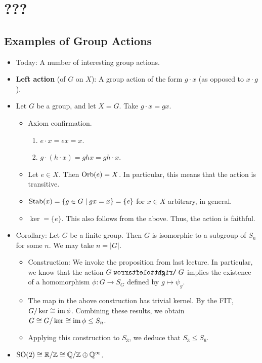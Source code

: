 \documentclass[../notes.tex]{subfiles}
\begin{document}
\chapter{???}
\section{Examples of Group Actions}
\begin{itemize}
    \item {}Today: A number of interesting group actions.
    \item \textbf{Left action} (of $G$ on $X$): A group action of the form $g\cdot x$ (as opposed to $x\cdot g$).
    \item Let $G$ be a group, and let $X=G$. Take $g\cdot x=gx$.
    \begin{itemize}
        \item Axiom confirmation.
        \begin{enumerate}
            \item $e\cdot x=ex=x$.
            \item $g\cdot(h\cdot x)=ghx=gh\cdot x$.
        \end{enumerate}
        \item Let $e\in X$. Then $\operatorname{Orb}(e)=X$. In particular, this means that the action is transitive.
        \item $\operatorname{Stab}(x)=\{g\in G\mid gx=x\}=\{e\}$ for $x\in X$ arbitrary, in general.
        \item $\ker=\{e\}$. This also follows from the above. Thus, the action is faithful.
    \end{itemize}
    \item Corollary: Let $G$ be a finite group. Then $G$ is isomorphic to a subgroup of $S_n$ for some $n$. We may take $n=|G|$.
    \begin{itemize}
        \item Construction: We invoke the proposition from last lecture. In particular, we know that the action $G\acts G$ implies the existence of a homomorphism $\phi:G\to S_G$ defined by $g\mapsto\psi_g$.
        \item The map in the above construction has trivial kernel. By the FIT, $G/\ker\cong\operatorname{im}\phi$. Combining these results, we obtain $G\cong G/\ker\cong\operatorname{im}\phi\leq S_n$.
        \item Applying this construction to $S_3$, we deduce that $S_3\leq S_6$.
    \end{itemize}
    \item $\text{SO}(2)\cong\mathbb{R}/\mathbb{Z}\cong\mathbb{Q}/\mathbb{Z}\oplus\mathbb{Q}^\infty$.

\end{itemize}
\end{document}

